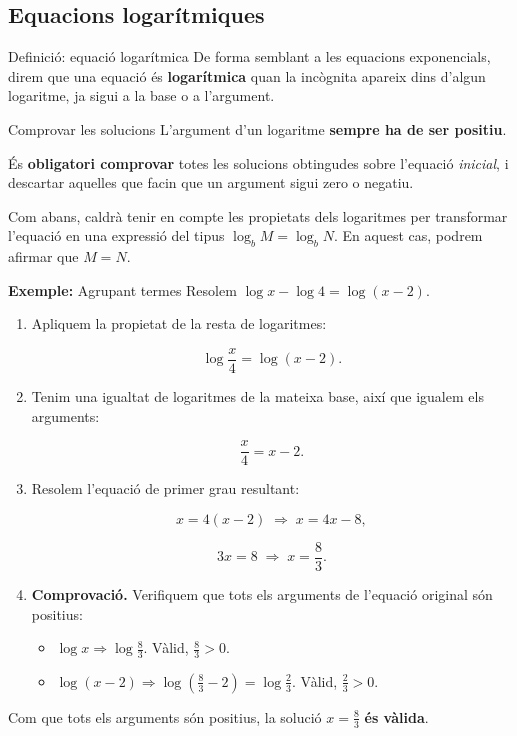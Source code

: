 \subsection{Equacions logarítmiques}

\begin{definicio}{Definició: equació logarítmica}
De forma semblant a les equacions exponencials, direm que una equació és \textbf{logarítmica} quan la incògnita apareix dins d'algun logaritme, ja sigui a la base o a l'argument.
\end{definicio}

\begin{nota}{Comprovar les solucions}
L'argument d'un logaritme \textbf{sempre ha de ser positiu}.

És \textbf{obligatori comprovar} totes les solucions obtingudes sobre l'equació \emph{inicial}, i descartar aquelles que facin que un argument sigui zero o negatiu.
\end{nota}

Com abans, caldrà tenir en compte les propietats dels logaritmes per transformar l'equació en una expressió del tipus $\log_b M = \log_b N$. En aquest cas, podrem afirmar que $M=N$.

\begin{exemple}{\textbf{Exemple:} Agrupant termes}
Resolem $\log x - \log 4 = \log(x-2)$.

\begin{enumerate}
\item Apliquem la propietat de la resta de logaritmes:

\[
\log \frac{x}{4} = \log(x-2).
\]
\item Tenim una igualtat de logaritmes de la mateixa base, així que igualem els arguments:

\[
\frac{x}{4} = x-2.
\]
\item Resolem l'equació de primer grau resultant:

\[
x = 4(x-2) \;\Rightarrow\; x = 4x - 8,
\]

\[
3x = 8 \;\Rightarrow\; x = \frac{8}{3}.
\]
\item \textbf{Comprovació.} Verifiquem que tots els arguments de l'equació original són positius:

\begin{itemize}
\item $\log x \Rightarrow \log \tfrac{8}{3}$. Vàlid, $\tfrac{8}{3} > 0$.
\item $\log(x-2) \Rightarrow \log\left(\tfrac{8}{3} - 2\right) = \log \tfrac{2}{3}$. Vàlid, $\tfrac{2}{3} > 0$.
\end{itemize}
\end{enumerate}

Com que tots els arguments són positius, la solució $x=\tfrac{8}{3}$ \textbf{és vàlida}.
\end{exemple}

